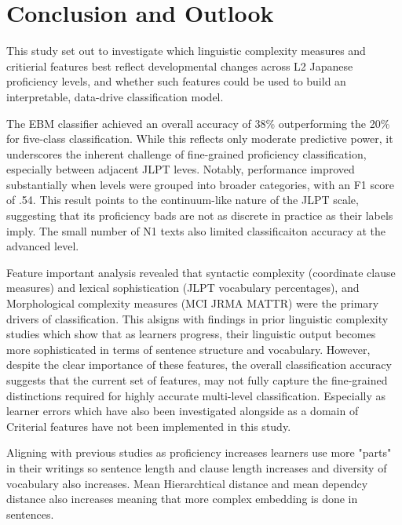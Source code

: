 \chapter{Conclusion and Outlook}
This study set out to investigate which linguistic complexity measures and critierial features best reflect
developmental changes across L2 Japanese proficiency levels, and whether such features could be used to build an
interpretable, data-drive classification model.

The EBM classifier achieved an overall accuracy of 38\% outperforming the 20\% for five-class classification. While
this reflects only moderate predictive power, it underscores the inherent challenge of fine-grained proficiency
classification, especially between adjacent JLPT leves. Notably, performance improved substantially when levels were
grouped into broader categories, with an F1 score of .54. This result points to the continuum-like nature of the
JLPT scale, suggesting that its proficiency bads are not as discrete in practice as their labels imply. The small
number of N1 texts also limited classificaiton accuracy at the advanced level.

Feature important analysis revealed that syntactic complexity (coordinate clause measures) and lexical
sophistication (JLPT vocabulary percentages), and Morphological complexity measures (MCI JRMA MATTR) were the primary
drivers of
classification. This alsigns with findings
in prior linguistic complexity studies which show that as learners progress, their linguistic output becomes more
sophisticated in terms of sentence structure and vocabulary. However, despite the clear importance of these features,
the overall classification accuracy suggests that the current set of features, may not fully capture the
fine-grained distinctions required for highly accurate multi-level classification. Especially as learner errors
which have also been investigated alongside as a domain of Criterial features have not been implemented in this study.


Aligning with previous studies as proficiency increases learners use more "parts" in their writings so sentence
length and clause length increases and diversity of vocabulary also increases. Mean Hierarchtical distance and mean
dependcy distance
also increases meaning
that more complex embedding is done in sentences.


